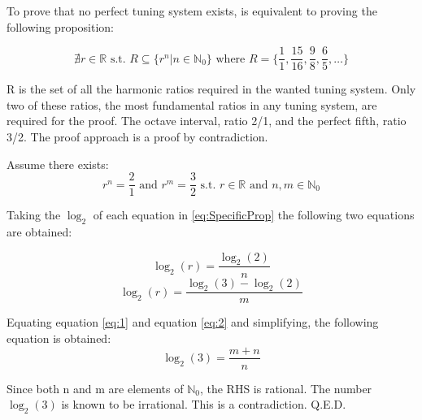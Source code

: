 
To prove that no perfect tuning system exists, is equivalent to proving the
following proposition:

\begin{equation}\label{eq:GeneralProp}
	\nexists r \in \mathbb{R} \text{ s.t. }
	R \subseteq \{ r^n | n \in \mathbb{N}_0 \}
	\text{ where } R = \{ \frac{1}{1}, \frac{15}{16}, \frac{9}{8}, \frac{6}{5}, \dots \}
\end{equation}

R is the set of all the harmonic ratios required in the wanted tuning system. Only
two of these ratios, the most fundamental ratios in any tuning system, are
required for the proof. The octave interval, ratio 2/1, and the perfect fifth, ratio
3/2. The proof approach is a proof by contradiction.

Assume there exists:
\begin{equation}\label{eq:SpecificProp}
	r^n = \frac{2}{1} \text{ and } r^m = \frac{3}{2}
	\text{ s.t. }
	r \in \mathbb{R} \text{ and } n,m \in \mathbb{N}_0
\end{equation}

Taking the $\log_{2}$ of each equation in \ref{eq:SpecificProp} the following two
equations are obtained:

\begin{equation}\label{eq:1}
	\log_{2}(r) = \frac{\log_{2}(2)}{n}
\end{equation}
\begin{equation}\label{eq:2}
	\log_{2}(r) = \frac{\log_{2}(3) - \log_{2}(2)}{m}
\end{equation}

Equating equation \ref{eq:1} and equation \ref{eq:2} and simplifying, the following
equation is obtained:
\begin{equation}\label{eq:2}
	\log_{2}(3) = \frac{m+n}{n}
\end{equation}

Since both n and m are elements of $\mathbb{N}_0$, the RHS is rational.
The number $\log_{2}(3)$ is known to be irrational. This is a contradiction. Q.E.D.
